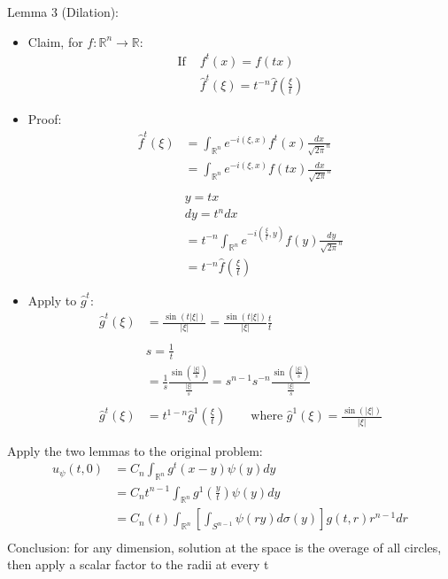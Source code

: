 \documentclass[12pt, a4paper]{article}
\begin{document}
Lemma 3 (Dilation):
\begin{itemize}
    \item Claim, for $f:\mathbb{R}^n\rightarrow\mathbb{R}$:
    \begin{align*}
        \text{If }&f^t(x)=f(tx)\\
        &\hat{f}^t(\xi)=t^{-n}\hat{f}\left(\frac{\xi}{t}\right) 
    \end{align*}
    \item Proof:
    \begin{align*}
        \hat{f}^t(\xi)&=\int_{\mathbb{R}^n}e^{-i(\xi, x)}f^t(x)\frac{dx}{\sqrt{2\pi}^n}\\
        &=\int_{\mathbb{R}^n}e^{-i(\xi, x)}f(tx)\frac{dx}{\sqrt{2\pi}^n}\\\\
        &y = tx\\
        &dy = t^ndx\\
        &=t^{-n}\int_{\mathbb{R}^n}e^{-i(\frac{\xi}{t}, y)}f(y)\frac{dy}{\sqrt{2\pi}^n}\\
        &=t^{-n}\hat{f}\left(\frac{\xi}{t}\right)
    \end{align*}
    \item Apply to $\hat{g}^t$:
    \begin{align*}
        \hat{g}^t(\xi) & = \frac{\sin(t|\xi|)}{|\xi|}= \frac{\sin(t|\xi|)}{|\xi|}\frac{t}{t}\\\\
        & s = \frac{1}{t}\\
        &= \frac{1}{s}\frac{\sin(\frac{|\xi|}{s})}{\frac{|\xi|}{s}}=s^{n-1}s^{-n}\frac{\sin(\frac{|\xi|}{s})}{\frac{|\xi|}{s}}\\\\
        \hat{g}^t(\xi) &= t^{1-n}\hat{g}^1\left(\frac{\xi}{t}\right)\qquad \text{where }\hat{g}^1(\xi) = \frac{\sin(|\xi|)}{|\xi|}
    \end{align*}
\end{itemize}
Apply the two lemmas to the original problem:
\begin{align*}
    u_\psi(t, 0) &= C_n\int_{\mathbb{R}^n} g^t(x-y)\psi(y)dy\\
    &=C_n t^{n-1}\int_{\mathbb{R}^n} g^1(\frac{y}{t})\psi(y)dy\\
    &=C_n(t) \int_{\mathbb{R}^n}\left[\int_{S^{n-1}}\psi(ry)d\sigma(y)\right]g(t, r)r^{n-1}dr\\
\end{align*}
Conclusion: for any dimension, solution at the space is the overage of all circles, then apply a scalar factor to the radii at every t
\vspace{0.3em}
\end{document}
